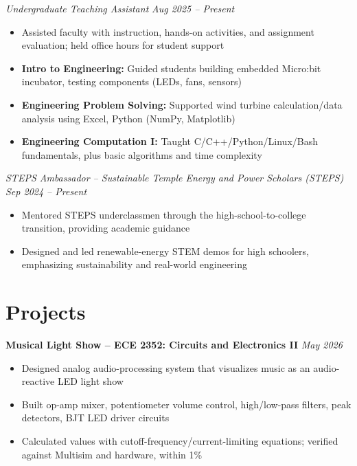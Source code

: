 \documentclass[11pt, letterpaper]{article}
\newcommand{\subrole}[2]{%
    \noindent\textit{#1} \hfill \textit{#2}%
    \vspace{0pt}
}
\newcommand{\projectentry}[2]{%
    \noindent\textbf{#1} \hfill \textit{#2}%
    \vspace{0pt}
}
\begin{document}
\vspace{1pt}
\subrole{Undergraduate Teaching Assistant}{Aug 2025 -- Present}
\begin{itemize}
    \item Assisted faculty with instruction, hands-on activities, and assignment evaluation; held office hours for student support
    \item \textbf{Intro to Engineering:} Guided students building embedded Micro:bit incubator, testing components (LEDs, fans, sensors)
    \item \textbf{Engineering Problem Solving:} Supported wind turbine calculation/data analysis using Excel, Python (NumPy, Matplotlib)
    \item \textbf{Engineering Computation I:} Taught C/C++/Python/Linux/Bash fundamentals, plus basic algorithms and time complexity
\end{itemize}

\vspace{1pt}
\subrole{STEPS Ambassador -- Sustainable Temple Energy and Power Scholars (STEPS)}{Sep 2024 -- Present}
\begin{itemize}
    \item Mentored STEPS underclassmen through the high-school-to-college transition, providing academic guidance
    \item Designed and led renewable-energy STEM demos for high schoolers, emphasizing sustainability and real-world engineering
\end{itemize}

\vspace{2pt}

\section{Projects}

\projectentry{Musical Light Show -- ECE 2352: Circuits and Electronics II}{May 2026}
\begin{itemize}
    \item Designed analog audio-processing system that visualizes music as an audio-reactive LED light show
    \item Built op-amp mixer, potentiometer volume control, high/low-pass filters, peak detectors, BJT LED driver circuits
    \item Calculated values with cutoff-frequency/current-limiting equations; verified against Multisim and hardware, within 1\%
\end{itemize}
\end{document}
